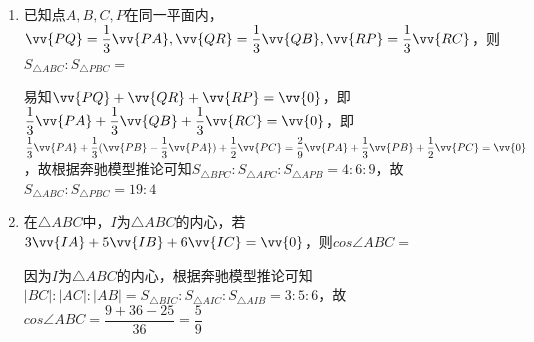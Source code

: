 \begin{enumerate}
\begin{enumerate}
        \begin{jieda}
            根据奔驰模型推论可知$S_{\triangle BOC}:S_{\triangle AOC}:S_{\triangle AOB} = 1:2:3$，易知$O$在三角形外，与$A$分别在$BC$的两侧，因此$S_{\triangle ABC} = S_{\triangle AOC} + S_{\triangle AOB} - S_{\triangle BOC}$，$\dfrac{S_{\triangle ABC}}{S_{\triangle BOC}} = \dfrac{2+3-1}{1} = 4$
        \end{jieda}
        \item 已知点$A,B,C,P$在同一平面内，$\vv{PQ} = \dfrac{1}{3}\vv{PA}, \vv{QR} = \dfrac{1}{3}\vv{QB},\vv{RP} = \dfrac{1}{3}\vv{RC}$，则$S_{\triangle ABC} : S_{\triangle PBC} = $
        \begin{jieda}
            易知$\vv{PQ} + \vv{QR} + \vv{RP} = \vv{0}$，即$\dfrac{1}{3}\vv{PA} + \dfrac{1}{3}\vv{QB} + \dfrac{1}{3}\vv{RC} = \vv{0}$，即$\dfrac{1}{3}\vv{PA} + \dfrac{1}{3}(\vv{PB} - \dfrac{1}{3}\vv{PA}) + \dfrac{1}{2}\vv{PC} = \dfrac{2}{9}\vv{PA} + \dfrac{1}{3}\vv{PB} + \dfrac{1}{2}\vv{PC} = \vv{0}$，故根据奔驰模型推论可知$S_{\triangle BPC} : S_{\triangle APC} : S_{\triangle APB} = 4:6:9$，故$S_{\triangle ABC} : S_{\triangle PBC} = 19 : 4$
        \end{jieda}
        
        \item 在$\triangle ABC$中，$I$为$\triangle ABC$的内心，若$3\vv{IA} + 5 \vv{IB} + 6\vv{IC} = \vv{0}$，则$cos\angle ABC= $
        \begin{jieda}
            因为$I$为$\triangle ABC$的内心，根据奔驰模型推论可知$|BC| : |AC| : |AB|  = S_{\triangle BIC} : S_{\triangle AIC}:S_{\triangle AIB} = 3 : 5 : 6$，故$cos\angle ABC = \dfrac{9 + 36 - 25}{36} = \dfrac{5}{9}$ 
        \end{jieda}
        

\end{enumerate}
\end{enumerate}

